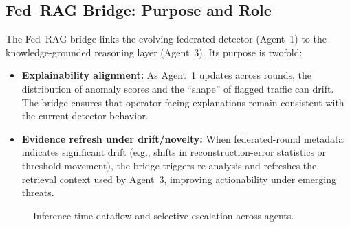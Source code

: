 \documentclass[conference]{IEEEtran}
\begin{document}
\subsection{Fed--RAG Bridge: Purpose and Role}
The Fed--RAG bridge links the evolving federated detector (Agent~1) to the knowledge-grounded reasoning layer (Agent~3). Its purpose is twofold:
\begin{itemize}
  \item \textbf{Explainability alignment:} As Agent~1 updates across rounds, the distribution of anomaly scores and the ``shape'' of flagged traffic can drift. The bridge ensures that operator-facing explanations remain consistent with the current detector behavior.
  \item \textbf{Evidence refresh under drift/novelty:} When federated-round metadata indicates significant drift (e.g., shifts in reconstruction-error statistics or threshold movement), the bridge triggers re-analysis and refreshes the retrieval context used by Agent~3, improving actionability under emerging threats.
\end{itemize}


\begin{figure}[t]
\centering
{}
\caption{Inference-time dataflow and selective escalation across agents.}
\label{fig:dataflow}
\end{figure}
\end{document}
